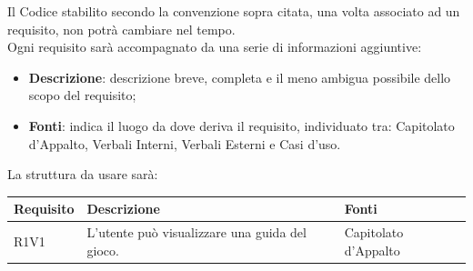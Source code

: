 				Il Codice stabilito secondo la convenzione sopra citata, una volta associato ad un requisito, non potrà cambiare nel tempo. \\
				Ogni requisito sarà accompagnato da una serie di informazioni aggiuntive:\\
				\begin{itemize}
					\item\textbf{Descrizione}: descrizione breve, completa e il meno ambigua possibile dello scopo del requisito;
					\item\textbf{Fonti}: indica il luogo da dove deriva il requisito, individuato tra: Capitolato d’Appalto, Verbali Interni, Verbali Esterni e Casi d’uso.
				\end{itemize}
				La struttura da usare sarà:
				\begin{center}
					\begin{longtable}{|p{4.5cm}|p{4.5cm}|p{4.5cm}|}
						\hline
						\rowcolor{lighter-grayer}
						\textbf{Requisito} & \textbf{Descrizione} & \textbf{Fonti}\\
						\hline
						\endfirsthead
						R1V1 & L’utente può visualizzare una guida del gioco. & Capitolato d'Appalto  \\
					\end{longtable}
				\end{center}
